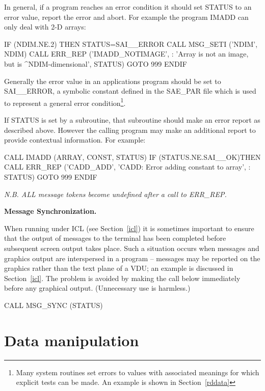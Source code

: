 \documentclass[twoside,11pt,nolof]{starlink}
\begin{document}
In general, if a program reaches an error condition it should set STATUS
to  an error value, report the error and abort.
For example the program IMADD can only deal with 2-D arrays:
\begin{terminalv}
      IF (NDIM.NE.2) THEN
         STATUS=SAI__ERROR
         CALL MSG_SETI ('NDIM', NDIM)
         CALL ERR_REP ('IMADD_NOTIMAGE',
     :        'Array is not an image, but is ^NDIM-dimensional', STATUS)
         GOTO 999
      ENDIF
\end{terminalv}
Generally the error value in an applications program should be set
to SAI\_\_ERROR, a symbolic
constant defined in the SAE\_PAR file which is used to represent a general
error condition\footnote{Many system routines set errors to
values with associated meanings for which explicit
tests can be made. An example is shown in Section~\ref{rddata}}.

If STATUS is set by a subroutine, that subroutine should make an error report
as described above. However the calling program may make an additional
report to provide contextual information.
For example:
\begin{terminalv}
      CALL IMADD (ARRAY, CONST, STATUS)
      IF (STATUS.NE.SAI__OK)THEN
         CALL ERR_REP ('CADD_ADD', 'CADD: Error adding constant to array',
     :                  STATUS)
         GOTO 999
      ENDIF
\end{terminalv}
{\sl N.B. ALL message tokens become undefined after a call to ERR\_REP.}

{\bigskip\large\bf Message Synchronization.}

When running under ICL (see Section~\ref{icl}) it is sometimes important
to ensure that the output of messages to the terminal has been completed
before subsequent screen output takes place.
Such a situation occurs when messages and graphics output are interspersed
in a program --
messages may be reported on the graphics rather than the text plane of a VDU;
an example is discussed in Section~\ref{icl}.
The problem is avoided by making the call below immediately before any
graphical output. (Unnecessary use is harmless.)
\begin{terminalv}
      CALL MSG_SYNC (STATUS)
\end{terminalv}

\newpage
\section{Data manipulation\label{add7}}
\end{document}
